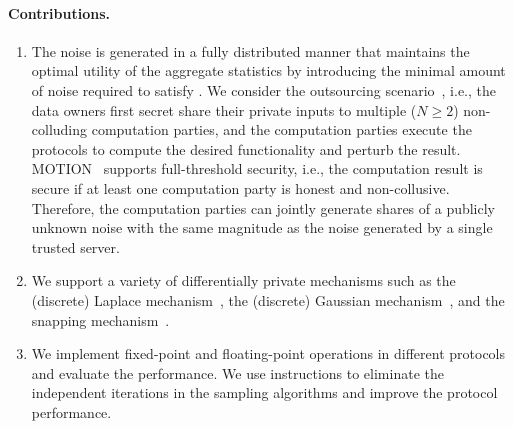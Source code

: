 \paragraph{Contributions.}
\label{para:Contributions}
\begin{enumerate}

    \item The noise is generated in a fully distributed manner that maintains the optimal utility of the aggregate statistics by introducing the minimal amount of noise required to satisfy \differentialprivacy.
          We consider the outsourcing scenario~\cite{kamara2011secure}, i.e., the data owners first secret share their private inputs to multiple ($N \geq 2$) non-colluding computation parties, and the computation parties execute the \smpc protocols to compute the desired functionality and perturb the result. MOTION~\cite{braun2022motion} supports full-threshold security, i.e., the computation result is secure if at least one computation party is honest and non-collusive. Therefore, the computation parties can jointly generate shares of a publicly unknown noise with the same magnitude as the noise generated by a single trusted server.

    \item We support a variety of differentially private mechanisms such as the (discrete) Laplace mechanism~\cite{chan2012privacy,ghosh2012universally,dwork2014algorithmic}, the (discrete) Gaussian mechanism~\cite{dwork2014algorithmic, canonne2020discrete}, and the snapping mechanism~\cite{mironov2012significance}.

    \item We implement fixed-point and floating-point operations in different \smpc protocols and evaluate the performance. We use \simd instructions to eliminate the independent iterations in the sampling algorithms and improve the protocol performance.

\end{enumerate}


